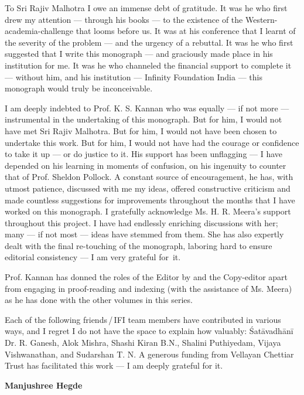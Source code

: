 To Sri Rajiv Malhotra I owe an immense debt of gratitude. It was he who first drew my attention --- through his books --- to the existence of the Western-academia-challenge that looms before us. It was at his conference that I learnt of the severity of the problem --- and the urgency of a rebuttal. It was he who first suggested that I write this monograph --- and graciously made place in his institution for me. It was he who channeled the financial support to complete it --- without him, and his institution --- Infinity Foundation India --- this monograph would truly be inconceivable.   

I am deeply indebted to Prof. K. S. Kannan who was equally --- if not more --- instrumental in the undertaking of this monograph. But for him, I would not have met Sri Rajiv Malhotra. But for him, I would not have been chosen to undertake this work. But for him, I would not have had the courage or confidence to take it up --- or do justice to it. His support has been unflagging --- I have depended on his learning in moments of confusion, on his ingenuity to counter that of Prof. Sheldon Pollock. A constant source of encouragement, he has, with utmost patience, discussed with me my ideas, offered constructive criticism and made countless suggestions for improvements throughout the months that I have worked on this monograph.  I gratefully acknowledge Ms. H. R. Meera’s support throughout this project. I have had endlessly enriching discussions with her; many --- if not most --- ideas have stemmed from them.  She has also expertly dealt with the final re-touching of the monograph, laboring hard to ensure editorial consistency --- I am very grateful for~it.

Prof. Kannan has donned the roles of the Editor by and the Copy-editor apart from engaging in proof-reading and indexing (with the assistance of Ms. Meera) as he has done with the other volumes in this series. 

Each of the following friends\,/\,IFI team members have contributed in various ways, and I regret I do not have the space to explain how valuably: Śatāvadhānī Dr. R. Ganesh, Alok Mishra, Shashi Kiran B.N., Shalini Puthiyedam, Vijaya Vishwanathan, and Sudarshan T. N. A generous funding from Vellayan Chettiar Trust has facilitated this work --- I am deeply grateful for it. 


\bigskip
\hfill {\bf Manjushree Hegde}


